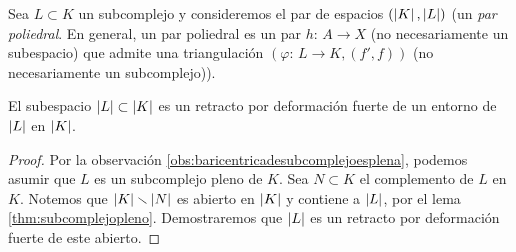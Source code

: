 Sea $L\subset K$ un subcomplejo y consideremos el par de espacios
$(\left|K\right|,\left|L\right|)$ (un \emph{par poliedral}. En general, un par poliedral
es un par $h:\,A\rightarrow X$ (no necesariamente un subespacio) que admite
una triangulaci\'{o}n $(\varphi:\,L\rightarrow K, (f',f))$ (no necesariamente
un subcomplejo)).

\begin{propoSubcomplejoEsRetracto}\label{thm:subcomplejoesretracto}
	El subespacio $\left|L\right|\subset\left|K\right|$ es un retracto por
	deformaci\'{o}n fuerte de un entorno de $\left|L\right|$ en $\left|K\right|$.
\end{propoSubcomplejoEsRetracto}

\begin{proof}
	Por la observaci\'{o}n \ref{obs:baricentricadesubcomplejoesplena},
	podemos asumir que $L$ es un subcomplejo pleno de $K$. Sea $N\subset K$
	el complemento de $L$ en $K$. Notemos que $\left|K\right|\smallsetminus\left|N\right|$
	es abierto en $\left|K\right|$ y contiene a $\left|L\right|$, por el lema
	\ref{thm:subcomplejopleno}. Demostraremos que $\left|L\right|$ es un
	retracto por deformaci\'{o}n fuerte de este abierto.


\end{proof}
